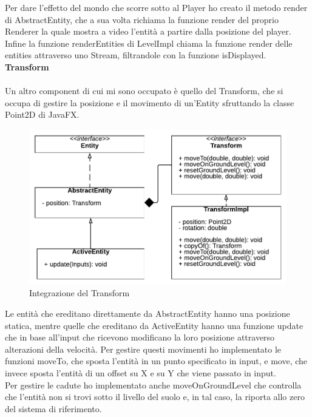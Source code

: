 \documentclass[a4paper,12pt]{report}
\begin{document}
Per dare l'effetto del mondo che scorre sotto al Player ho creato il metodo render di AbstractEntity, che a sua volta richiama la funzione render del proprio Renderer la quale mostra a video l'entità a partire dalla posizione del player.\\

Infine la funzione renderEntities di LevelImpl chiama la funzione render delle entities attraverso uno Stream, filtrandole con la funzione isDisplayed.\\

\textbf{Transform}\\
\\
Un altro component di cui mi sono occupato è quello del Transform, che si occupa di gestire la posizione e il movimento di un'Entity sfruttando la classe Point2D di JavaFX.

\begin{figure}[ht]
\includegraphics[width=1\textwidth]{images/Transform.png}
\caption{Integrazione del Transform}
\label{fig:transform}
\end{figure}

Le entità che ereditano direttamente da AbstractEntity hanno una posizione statica, mentre quelle che ereditano da ActiveEntity hanno una funzione update che in base all'input che ricevono modificano la loro posizione attraverso alterazioni della velocità. Per gestire questi movimenti ho implementato le funzioni moveTo, che sposta l'entità in un punto specificato in input, e move, che invece sposta l'entità di un offset su X e su Y che viene passato in input.\\
Per gestire le cadute ho implementato anche moveOnGroundLevel che controlla che l'entità non si trovi sotto il livello del suolo e, in tal caso, la riporta allo zero del sistema di riferimento.\\
\end{document}
